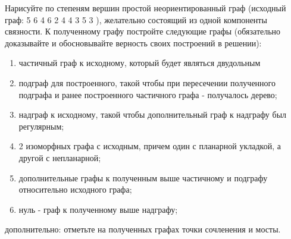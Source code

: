 \question
Нарисуйте по степеням вершин простой неориентированный граф (исходный граф: 5 6 4 6 2 4 4 3 5 3 ), желательно состоящий из одной компоненты связности. 
К полученному графу постройте следующие графы (обязательно доказывайте и  обосновывайте верность своих построений в решении):
\begin{enumerate}
\item   частичный граф к исходному, который будет являться двудольным
\item   подграф для построенного, такой чтобы при пересечении полученного подграфа и ранее построенного частичного графа - получалось дерево;
\item   надграф к исходному, такой чтобы  дополнительный граф к надграфу был  регулярным;
\item   2 изоморфных графа с исходным, причем один с планарной укладкой, а другой с непланарной;
\item   дополнительные графы к полученным выше частичному и подграфу относительно исходного графа;
\item   нуль - граф к полученному выше надграфу;
\end{enumerate}
дополнительно: отметьте на полученных графах точки сочленения и мосты.




